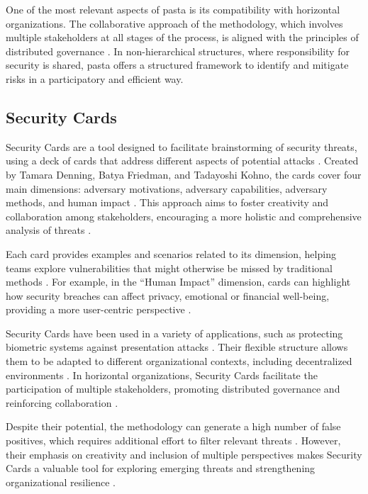 One of the most relevant aspects of \gls{pasta} is its compatibility with
horizontal organizations. The collaborative approach of the methodology, which
involves multiple stakeholders at all stages of the process, is aligned with the
principles of distributed governance \cite{Colbac}. In non-hierarchical
structures, where responsibility for security is shared, \gls{pasta} offers a
structured framework to identify and mitigate risks in a participatory and
efficient way.

\subsection{Security Cards}
\label{subsec:security_cards}

Security Cards are a tool designed to facilitate brainstorming of security
threats, using a deck of cards that address different aspects of potential
attacks \cite{SecurityCardsToolkit}. Created by Tamara Denning, Batya Friedman,
and Tadayoshi Kohno, the cards cover four main dimensions: adversary
motivations, adversary capabilities, adversary methods, and human impact
\cite{KeepingAheadofOurAdversaries}. This approach aims to foster creativity and
collaboration among stakeholders, encouraging a more holistic and comprehensive
analysis of threats \cite{CyberThreatModeling}.

Each card provides examples and scenarios related to its dimension, helping
teams explore vulnerabilities that might otherwise be missed by traditional
methods \cite{SecurityCardsToolkit}. For example, in the “Human Impact”
dimension, cards can highlight how security breaches can affect privacy,
emotional or financial well-being, providing a more user-centric perspective
\cite{KeepingAheadofOurAdversaries}.

Security Cards have been used in a variety of applications, such as protecting
biometric systems against presentation attacks
\cite{AttackTreesforProtectingBiometric, KeepingAheadofOurAdversaries}. Their
flexible structure allows them to be adapted to different organizational
contexts, including decentralized environments
\cite{ParticipatoryThreatModelling}. In horizontal organizations, Security Cards
facilitate the participation of multiple stakeholders, promoting distributed
governance and reinforcing collaboration \cite{CyberThreatModeling}.

Despite their potential, the methodology can generate a high number of false
positives, which requires additional effort to filter relevant threats
\cite{KeepingAheadofOurAdversaries}. However, their emphasis on creativity and
inclusion of multiple perspectives makes Security Cards a valuable tool for
exploring emerging threats and strengthening organizational resilience
\cite{CyberThreatModeling}.

